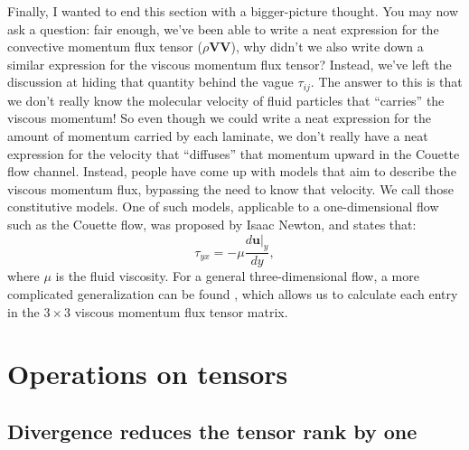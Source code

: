 \documentclass[10pt,twocolumn]{article}
\begin{document}
Finally, I wanted to end this section with a bigger-picture thought. You may now ask a question: fair enough, we've been able to write a neat expression for the convective momentum flux tensor ($\rho \pmb{V} \pmb{V}$), why didn't we also write down a similar expression for the viscous momentum flux tensor? Instead, we've left the discussion at hiding that quantity behind the vague $\tau_{ij}$. The answer to this is that we don't really know the molecular velocity of fluid particles that ``carries'' the viscous momentum! So even though we could write a neat expression for the amount of momentum carried by each laminate, we don't really have a neat expression for the velocity that ``diffuses'' that momentum upward in the Couette flow channel. Instead, people have come up with models that aim to describe the viscous momentum flux, bypassing the need to know that velocity. We call those constitutive models. One of such models, applicable to a one-dimensional flow such as the Couette flow, was proposed by Isaac Newton, and states that:
\begin{equation*}
\tau_{yx} = - \mu \frac{d \pmb{u}|_y}{dy} ,
\end{equation*}
where $\mu$ is the fluid viscosity.
For a general three-dimensional flow, a more complicated generalization can be found \cite{BSL}, which allows us to calculate each entry in the $3 \times 3$ viscous momentum flux tensor matrix.







\section*{Operations on tensors}

\subsection*{Divergence reduces the tensor rank by one}
\end{document}
